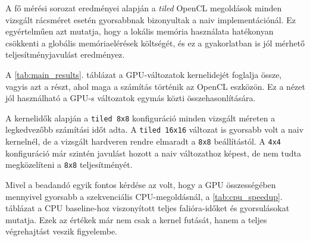 \documentclass[12pt,a4paper]{article}
\begin{document}
A fő mérési sorozat eredményei alapján a \emph{tiled} OpenCL megoldások minden vizsgált rácsméret esetén gyorsabbnak bizonyultak a naiv implementációnál. Ez egyértelműen azt mutatja, hogy a lokális memória használata hatékonyan csökkenti a globális memóriaelérések költségét, és ez a gyakorlatban is jól mérhető teljesítményjavulást eredményez.

A \ref{tab:main_results}. táblázat a GPU-változatok kernelidejét foglalja össze, vagyis azt a részt, ahol maga a számítás történik az OpenCL eszközön. Ez a nézet jól használható a GPU-s változatok egymás közti összehasonlítására.

\begin{table}[H]
\centering
\caption{A GPU-változatok kernelideje a \texttt{wrap=0} esetén.}
\label{tab:main_results}
\end{table}

A kernelidők alapján a \texttt{tiled 8x8} konfiguráció minden vizsgált méreten a legkedvezőbb számítási időt adta. A \texttt{tiled 16x16} változat is gyorsabb volt a naiv kernelnél, de a vizsgált hardveren rendre elmaradt a \texttt{8x8} beállítástól. A \texttt{4x4} konfiguráció már szintén javulást hozott a naiv változathoz képest, de nem tudta megközelíteni a \texttt{8x8} teljesítményét.

Mivel a beadandó egyik fontos kérdése az volt, hogy a GPU összességében mennyivel gyorsabb a szekvenciális CPU-megoldásnál, a \ref{tab:cpu_speedup}. táblázat a CPU baseline-hoz viszonyított teljes falióra-időket és gyorsulásokat mutatja. Ezek az értékek már nem csak a kernel futását, hanem a teljes végrehajtást veszik figyelembe.
\end{document}
